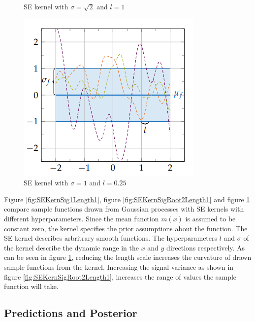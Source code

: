 \documentclass[12pt,a4paper]{report}
\theoremstyle{definition}
\begin{document}
\begin{figure}[H]
\begin{minipage}[t]{0.3\textwidth}
	    	\caption{SE kernel with $\sigma=\sqrt{2}$ and $l=1$ \citep{Kaiser2017}}
	    	\label{fig:SEKernSigRoot2Length1}
	\end{minipage}
	\hfill
	\begin{minipage}[t]{0.3\textwidth}
	 	\includegraphics[width=\linewidth]{RBF_sigma_1_lengthscale_025.png}
	    	\caption{SE kernel with $\sigma=1$ and $l=0.25$ \citep{Kaiser2017}}
	    	\label{fig:SEKernSig1Length0.25}
	\end{minipage}
\end{figure}

Figure \ref{fig:SEKernSig1Length1}, figure \ref{fig:SEKernSigRoot2Length1} and figure \ref{fig:SEKernSig1Length0.25} compare sample functions drawn from Gaussian processes with SE kernels with different hyperparameters. 
Since the mean function $m(x)$ is assumed to be constant zero, the kernel specifies the prior assumptions about the function.
The SE kernel describes arbritrary smooth functions. The hyperparameters $l$ and $\sigma$ of the kernel describe the dynamic range in the $x$ and $y$ directions respectively.
As can be seen in figure \ref{fig:SEKernSig1Length0.25}, reducing the length scale increases the curvature of drawn sample functions from the kernel.
Increasing the signal variance as shown in figure \ref{fig:SEKernSigRoot2Length1}, increases the range of values the sample function will take.

\subsection{Predictions and Posterior}
\end{document}
